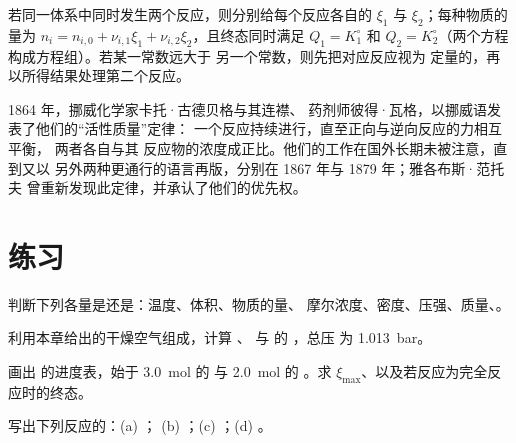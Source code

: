 \begin{method}[两个同时发生的反应]\label{met:b1:extent-q-and-k:two-reactions}
若同一体系中同时发生两个反应，则分别给每个反应各自的
 $\xi_1$ 与 $\xi_2$；每种物质的量为 $n_i = n_{i,0} + \nu_{i,1}\xi_1
+ \nu_{i,2}\xi_2$，且终态同时满足 $Q_1 = K_1^\circ$ 和
$Q_2 = K_2^\circ$（两个方程构成方程组）。若某一常数远大于
另一个常数，则先把对应反应视为
定量的，再以所得结果处理第二个反应。
\end{method}

\begin{history}[质量作用定律，1864]
1864 年，挪威化学家卡托·古德贝格与其连襟、
药剂师彼得·瓦格，以挪威语发表了他们的“活性质量”定律：
一个反应持续进行，直至正向与逆向反应的力相互平衡，
两者各自与其
反应物的浓度成正比。他们的工作在国外长期未被注意，直到又以
另外两种更通行的语言再版，分别在 1867 年与 1879 年；雅各布斯·范托夫
曾重新发现此定律，并承认了他们的优先权。
\end{history}

\section{练习}

\begin{exercise}[$\star$]\label{exo:b1:extent-q-and-k:1}
判断下列各量是还是：温度、体积、物质的量、
摩尔浓度、密度、压强、质量、。
\end{exercise}

\begin{exercise}[$\star$]\label{exo:b1:extent-q-and-k:2}
利用本章给出的干燥空气组成，计算 、 与  的
，总压
为 \qty{1.013}{bar}。
\end{exercise}

\begin{exercise}[$\star$]\label{exo:b1:extent-q-and-k:3}
画出  的进度表，始于 \qty{3.0}{mol} 的
 与 \qty{2.0}{mol} 的 。求 $\xi_{\max}$、以及若反应为完全反应时的终态。
\end{exercise}

\begin{exercise}[$\star$]\label{exo:b1:extent-q-and-k:4}
写出下列反应的：(a) ；
(b) ；(c) ；(d) 。
\end{exercise}

